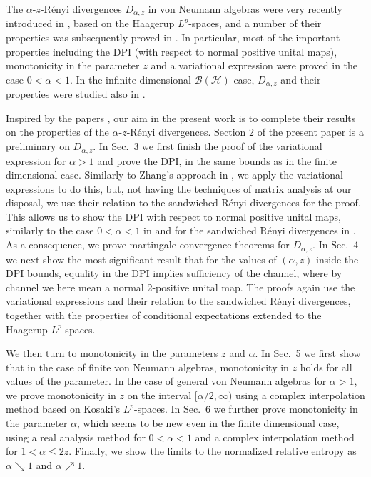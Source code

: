 \documentclass[12pt]{article}
\theoremstyle{definition}
\theoremstyle{remark}
\numberwithin{equation}{section}
\begin{document}
The $\alpha$-$z$-R\'enyi divergences $D_{\alpha,z}$ in von Neumann algebras were {very recently}
introduced in \cite{kato2023aremark}, {based on the Haagerup $L^p$-spaces}, and a number of
their properties was subsequently proved in \cite{kato2023onrenyi}. In particular, most of the important
properties including the DPI (with respect to normal positive unital maps), monotonicity in the parameter $z$
and a variational expression were proved in the case $0<\alpha<1$. In the infinite dimensional
$\mathcal{B}(\mathcal{H})$ case, $D_{\alpha,z}$ and their properties were studied also in
\cite{mosonyi2023thestrong}.


Inspired by the papers \cite{kato2023aremark, kato2023onrenyi}, our aim in the present
work is to complete their results on the properties of the $\alpha$-$z$-R\'enyi divergences.
{Section 2 of the present paper is a preliminary on $D_{\alpha,z}$. In Sec.~3} we first finish
the proof of the variational expression for $\alpha>1$ and prove the DPI, in the same bounds as in the
finite dimensional case. Similarly to {Zhang's approach} in \cite{zhang2020fromwyd}, we apply the
variational expressions to {do} this, but, not having the techniques of matrix analysis
at our disposal, we use their relation to the sandwiched R\'enyi divergences for the proof. This allows us
to show the DPI with respect to normal positive unital maps, similarly {to} the case $0<\alpha<1$
in \cite{kato2023onrenyi} and for the sandwiched R\'enyi divergences in
\cite{jencova2018renyi,jencova2021renyi}. As a consequence, we prove martingale convergence
theorems for $D_{\alpha,z}$. {In Sec.~4 we next show the most significant result} that for the
values of $(\alpha,z)$ inside the DPI bounds, equality in the DPI implies sufficiency of the channel,
where by channel we here mean a normal 2-positive unital map. The proofs again use the variational
expressions and their relation to the sandwiched R\'enyi divergences, together with the properties of
conditional expectations {extended to the Haagerup $L^p$-spaces.}

We then turn to monotonicity in the parameters $z$ and $\alpha$. {In Sec.~5 we} first show that in the
case of finite von Neumann algebras,  monotonicity in $z$ holds for all values of the parameter. 
In the case of general von Neumann algebras for $\alpha>1$, we prove monotonicity in $z$
on the interval $[\alpha/2,\infty)$ using {a} complex interpolation method
{based on Kosaki's $L^p$-spaces. In Sec.~6} we further prove monotonicity in the parameter
$\alpha$, which seems to be new even in the finite dimensional case, {using a real analysis method
for $0<\alpha<1$ and a complex interpolation method for $1<\alpha\le2z$. Finally, we show the limits
to the normalized relative entropy as} $\alpha\searrow 1$ and $\alpha\nearrow 1$.
\end{document}

